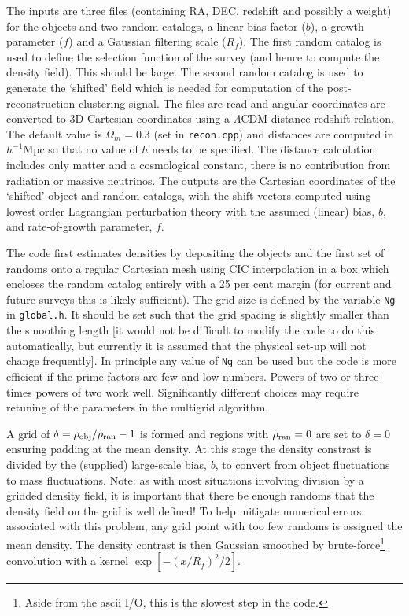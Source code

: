 \documentclass[a4paper,11pt]{article}
\begin{document}
The inputs are three files (containing RA, DEC, redshift and possibly a weight)
for the objects and two random catalogs, a linear bias factor ($b$), a growth
parameter ($f$) and a Gaussian filtering scale ($R_f$).
The first random catalog is used to define the selection function of the
survey (and hence to compute the density field).  This should be large.  The
second random catalog is used to generate the `shifted' field which is needed
for computation of the post-reconstruction clustering signal.
The files are read and angular coordinates are converted to 3D Cartesian
coordinates using a $\Lambda$CDM distance-redshift relation.  The default
value is $\Omega_m=0.3$ (set in {\tt recon.cpp}) and distances are computed
in $h^{-1}$Mpc so that no value of $h$ needs to be specified.  The distance
calculation includes only matter and a cosmological constant, there is no
contribution from radiation or massive neutrinos.
The outputs are the Cartesian coordinates of the `shifted' object and
random catalogs, with the shift vectors computed using lowest order
Lagrangian perturbation theory with the assumed (linear) bias, $b$, and
rate-of-growth parameter, $f$.

The code first estimates densities by depositing the objects and the first
set of randoms onto a regular Cartesian mesh using CIC interpolation in a box
which encloses the random catalog entirely with a 25 per cent margin (for
current and future surveys this is likely sufficient).
The grid size is defined by the variable {\tt Ng} in {\tt global.h}.  It
should be set such that the grid spacing is slightly smaller than the smoothing
length [it would not be difficult to modify the code to do this automatically,
but currently it is assumed that the physical set-up will not change
frequently].  In principle any value of {\tt Ng} can be used but the code is
more efficient if the prime factors are few and low numbers.  Powers of two or
three times powers of two work well.  Significantly different choices may
require retuning of the parameters in the multigrid algorithm.

A grid of $\delta=\rho_{\rm obj}/\rho_{\rm ran}-1$ is formed and regions
with $\rho_{\rm ran}=0$ are set to $\delta=0$ ensuring padding at the
mean density.
At this stage the density constrast is divided
by the (supplied) large-scale bias, $b$, to convert from object fluctuations
to mass fluctuations.
Note: as with most situations involving division by a gridded density field,
it is important that there be enough randoms that the density field on the
grid is well defined!  To help mitigate numerical errors associated with this
problem, any grid point with too few randoms is assigned the mean density.
The density contrast is then Gaussian smoothed by brute-force\footnote{Aside
{}from the ascii I/O, this is the slowest step in the code.} convolution with
a kernel $\exp[-(x/R_f)^2/2]$.
\end{document}
